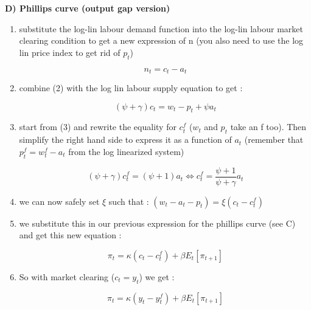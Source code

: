 \documentclass{article}
\begin{document}
\textbf{D) Phillips curve (output gap version)}
\begin{enumerate}
    \item substitute the log-lin labour demand function into the log-lin labour market clearing condition to get a new expression of n (you also need to use the log lin price index to get rid of $p_t$)
    \begin{expectedresultsbox}
    \begin{equation}
        n_t=c_t-a_t
    \end{equation}
    \end{expectedresultsbox}
    \item combine (2) with the log lin labour supply equation to get : 
    \begin{expectedresultsbox}
    \begin{equation}
        (\psi + \gamma)c_t=w_t-p_t+\psi a_t
    \end{equation}
    \end{expectedresultsbox}
    \item start from (3) and rewrite the equality for $c_t^f$ ($w_t$ and $p_t$ take an f too). Then simplify the right hand side to express it as a function of $a_t$ (remember that $p_t^f = w_t^f-a_t$ from the log linearized system)
    \begin{expectedresultsbox}
    \begin{equation}
        (\psi+\gamma)c_t^f = (\psi + 1)a_t \Longleftrightarrow c_t^f = \frac{\psi+1}{\psi + \gamma}a_t
    \end{equation}
    \end{expectedresultsbox}
    \item we can now safely set $\xi$ such that : $(w_t-a_t-p_t) = \xi (c_t-c_t^f)$
    \item we substitute this in our previous expression for the phillips curve (see C) and get this new equation : 
    \begin{expectedresultsbox}
    \begin{equation}
        \pi_t = \kappa(c_t-c_t^f)+\beta E_t[\pi_{t+1}]
    \end{equation}   
    \end{expectedresultsbox}
    \item So with market clearing ($c_t = y_t$) we get : 
    \begin{expectedresultsbox}
    \begin{equation}
        \pi_t = \kappa(y_t-y_t^f)+\beta E_t[\pi_{t+1}]
    \end{equation}
    \end{expectedresultsbox}


\end{enumerate}
\end{document}
